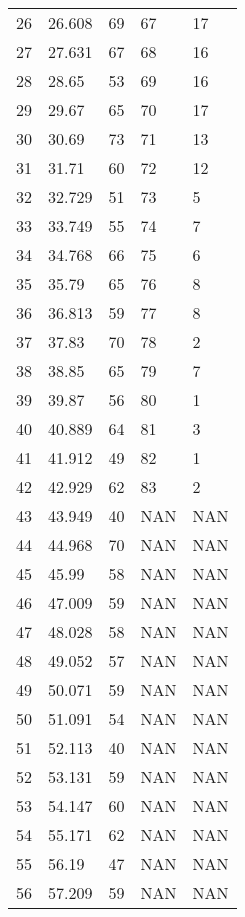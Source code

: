 \documentclass{article}
\begin{document}
\begin{longtable}{@{}lllll@{}}
				26  & 26.608  & 69    & 67    & 17    \\
				27  & 27.631  & 67    & 68    & 16    \\
				28  & 28.65   & 53    & 69    & 16    \\
				29  & 29.67   & 65    & 70    & 17    \\
				30  & 30.69   & 73    & 71    & 13    \\
				31  & 31.71   & 60    & 72    & 12    \\
				32  & 32.729  & 51    & 73    & 5     \\
				33  & 33.749  & 55    & 74    & 7     \\
				34  & 34.768  & 66    & 75    & 6     \\
				35  & 35.79   & 65    & 76    & 8     \\
				36  & 36.813  & 59    & 77    & 8     \\
				37  & 37.83   & 70    & 78    & 2     \\
				38  & 38.85   & 65    & 79    & 7     \\
				39  & 39.87   & 56    & 80    & 1     \\
				40  & 40.889  & 64    & 81    & 3     \\
				41  & 41.912  & 49    & 82    & 1     \\
				42  & 42.929  & 62    & 83    & 2     \\
				43  & 43.949  & 40    & NAN   & NAN   \\
				44  & 44.968  & 70    & NAN   & NAN   \\
				45  & 45.99   & 58    & NAN   & NAN   \\
				46  & 47.009  & 59    & NAN   & NAN   \\
				47  & 48.028  & 58    & NAN   & NAN   \\
				48  & 49.052  & 57    & NAN   & NAN   \\
				49  & 50.071  & 59    & NAN   & NAN   \\
				50  & 51.091  & 54    & NAN   & NAN   \\
				51  & 52.113  & 40    & NAN   & NAN   \\
				52  & 53.131  & 59    & NAN   & NAN   \\
				53  & 54.147  & 60    & NAN   & NAN   \\
				54  & 55.171  & 62    & NAN   & NAN   \\
				55  & 56.19   & 47    & NAN   & NAN   \\
				56  & 57.209  & 59    & NAN   & NAN   \\

\end{longtable}
\end{document}
